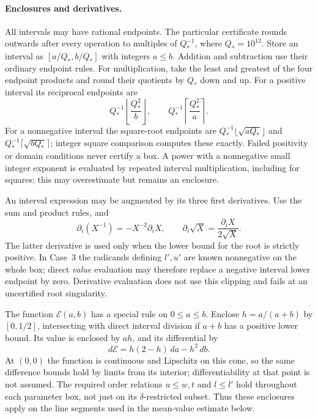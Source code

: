 \paragraph{Enclosures and derivatives.}
All intervals may have rational endpoints.  The particular certificate
rounds outwards after every operation to multiples of $Q_*^{-1}$,
where $Q_*=10^{12}$.  Store an interval as $[a/Q_*,b/Q_*]$ with integers
$a\leq b$.  Addition and subtraction use their ordinary endpoint rules.
For multiplication, take the least and greatest of the four endpoint
products and round their quotients by $Q_*$ down and up.  For a positive
interval its reciprocal endpoints are
\[
 Q_*^{-1}\left\lfloor\frac{Q_*^2}{b}\right\rfloor,
 \qquad Q_*^{-1}\left\lceil\frac{Q_*^2}{a}\right\rceil.
\]
For a nonnegative interval the square-root endpoints are
$Q_*^{-1}\lfloor\sqrt{aQ_*}\rfloor$ and
$Q_*^{-1}\lceil\sqrt{bQ_*}\rceil$; integer square comparison computes
these exactly.  Failed positivity or domain conditions never certify
a box.  A power with a nonnegative small integer exponent is evaluated
by repeated interval multiplication, including for squares; this may
overestimate but remains an enclosure.

An interval expression may be augmented by its three first derivatives.
Use the sum and product rules, and
\[
 \partial_i(X^{-1})=-X^{-2}\partial_iX,\qquad
 \partial_i\sqrt X=\frac{\partial_iX}{2\sqrt X}.
\]
The latter derivative is used only when the lower bound for the root is
strictly positive.  In Case~3 the radicands defining $l',u'$ are known
nonnegative on the whole box; direct \emph{value} evaluation may therefore
replace a negative interval lower endpoint by zero.  Derivative evaluation
does not use this clipping and fails at an uncertified root singularity.

The function $\mathcal E(a,b)$ has a special rule on $0\leq a\leq b$.
Enclose $h=a/(a+b)$ by $[0,1/2]$, intersecting with direct interval
division if $a+b$ has a positive lower bound.  Its value is enclosed by
$ah$, and its differential by
\begin{equation}\label{sc:E-derivative}
 d\mathcal E=h(2-h)\,da-h^2\,db.
\end{equation}
At $(0,0)$ the function is continuous and Lipschitz on this cone, so the
same difference bounds hold by limits from its interior; differentiability
at that point is not assumed.  The required order relations $u\leq w,t$
and $l\leq l'$ hold throughout each parameter box, not just on its
$\delta$-restricted subset.  Thus these enclosures apply on the line
segments used in the mean-value estimate below.

